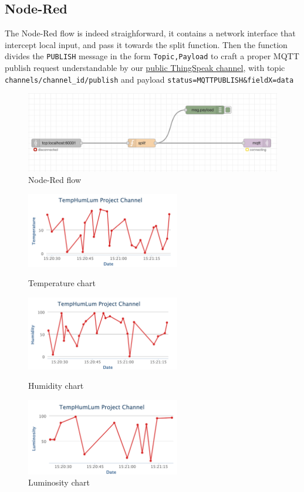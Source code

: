 \documentclass[11pt]{article}
\begin{document}
\subsection*{Node-Red}
The Node-Red flow is indeed straighforward, it contains a network interface that intercept local input, 
and pass it towards the split function. Then the function divides the \texttt{PUBLISH} message in the 
form \texttt{Topic,Payload} to craft a proper MQTT publish request understandable by our 
\href{https://thingspeak.com/channels/2240116}{public ThingSpeak channel}, with 
topic \texttt{channels/channel\_id/publish} and payload \texttt{status=MQTTPUBLISH\&fieldX=data} 
\begin{figure}[h]
  \centering
  \includegraphics[width=1\textwidth]{images/node_red.png}
  \caption{Node-Red flow}
\end{figure}

\begin{figure}[h]
  \centering
  \includegraphics[width=0.6\textwidth]{images/temperature.png}
  \caption{Temperature chart}
  \medskip
  \includegraphics[width=0.6\textwidth]{images/humidity.png}
  \caption{Humidity chart}
  \medskip
  \includegraphics[width=0.6\textwidth]{images/luminosity.png}
  \caption{Luminosity chart}
\end{figure}
\end{document}
